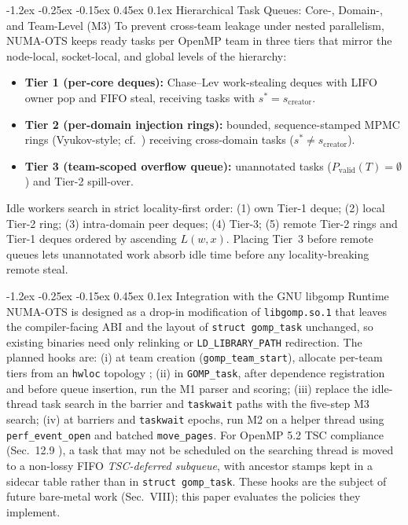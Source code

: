 \documentclass[10pt,twocolumn,letterpaper]{article}
\makeatletter
\renewcommand{\subsection}{\@startsection{subsection}{2}{\z@}%
  {-1.2ex \@plus -0.25ex \@minus -0.15ex}%
  {0.45ex \@plus 0.1ex}%
  {\normalfont\small\itshape}}
\makeatother
\begin{document}
\subsection{Hierarchical Task Queues: Core-, Domain-, and Team-Level (M3)}
To prevent cross-team leakage under nested parallelism, NUMA-OTS keeps ready tasks per OpenMP team in three tiers that mirror the node-local, socket-local, and global levels of the hierarchy:
\begin{itemize}\setlength{\itemsep}{1pt}\setlength{\parskip}{0pt}\setlength{\topsep}{2pt}
\item \textbf{Tier 1 (per-core deques):} Chase--Lev work-stealing deques \cite{ref15} with LIFO owner pop and FIFO steal, receiving tasks with $s^* = s_{\mathrm{creator}}$.
\item \textbf{Tier 2 (per-domain injection rings):} bounded, sequence-stamped MPMC rings (Vyukov-style; cf.\ \cite{ref31}) receiving cross-domain tasks ($s^* \ne s_{\mathrm{creator}}$).
\item \textbf{Tier 3 (team-scoped overflow queue):} unannotated tasks ($P_{\mathrm{valid}}(T) = \emptyset$) and Tier-2 spill-over.
\end{itemize}
Idle workers search in strict locality-first order: (1) own Tier-1 deque; (2) local Tier-2 ring; (3) intra-domain peer deques; (4) Tier-3; (5) remote Tier-2 rings and Tier-1 deques ordered by ascending $L(w,x)$. Placing Tier~3 before remote queues lets unannotated work absorb idle time before any locality-breaking remote steal.

\subsection{Integration with the GNU libgomp Runtime}
NUMA-OTS is designed as a drop-in modification of \texttt{libgomp.so.1} that leaves the compiler-facing ABI and the layout of \texttt{struct gomp\_task} unchanged, so existing binaries need only relinking or \texttt{LD\_LIBRARY\_PATH} redirection. The planned hooks are: (i) at team creation (\texttt{gomp\_team\_start}), allocate per-team tiers from an \texttt{hwloc} topology \cite{ref22}; (ii) in \texttt{GOMP\_task}, after dependence registration and before queue insertion, run the M1 parser and scoring; (iii) replace the idle-thread task search in the barrier and \texttt{taskwait} paths with the five-step M3 search; (iv) at barriers and \texttt{taskwait} epochs, run M2 on a helper thread using \texttt{perf\_event\_open} and batched \texttt{move\_pages}. For OpenMP 5.2 TSC compliance (Sec.~12.9 \cite{ref7}), a task that may not be scheduled on the searching thread is moved to a non-lossy FIFO \emph{TSC-deferred subqueue}, with ancestor stamps kept in a sidecar table rather than in \texttt{struct gomp\_task}. These hooks are the subject of future bare-metal work (Sec.~VIII); this paper evaluates the policies they implement.
\end{document}
